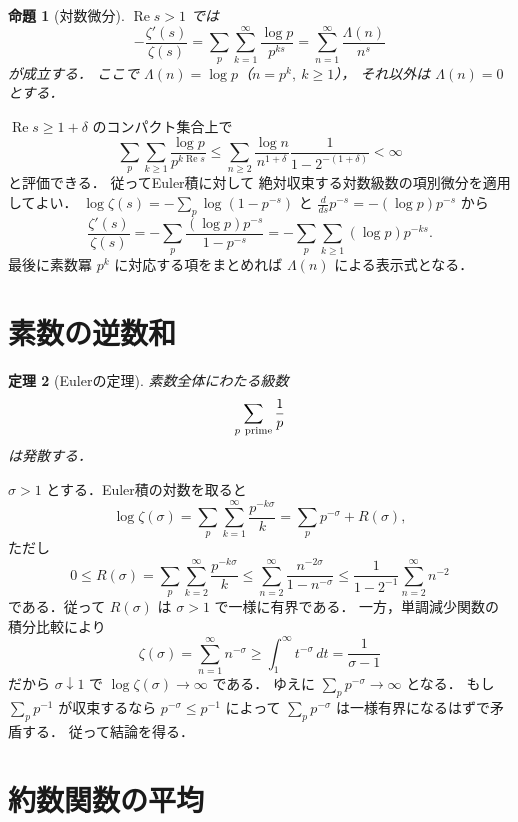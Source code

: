 \documentclass[a5paper,10pt,onecolumn]{jsarticle}
\makeatletter
\theoremstyle{mathnotetheorem}
\newtheorem{theorem}{定理}[section]
\newtheorem{proposition}[theorem]{命題}
\renewcommand{\proofname}{証明}
\renewenvironment{proof}[1][\proofname]{%
  \par\pushQED{\qed}\normalfont\topsep4\p@\@plus2\p@\relax
  \trivlist\item[\hskip\labelsep\bfseries #1]\ignorespaces
}{\popQED\endtrivlist\@endpefalse}
\makeatother
\begin{document}
\begin{proposition}[対数微分]\label{prop:log-derivative}
$\operatorname{Re}s>1$ では
\[
 -\frac{\zeta'(s)}{\zeta(s)}
 =\sum_p\sum_{k=1}^\infty
 \frac{\log p}{p^{ks}}
 =\sum_{n=1}^\infty\frac{\Lambda(n)}{n^s}
\]
が成立する．
ここで $\Lambda(n)=\log p$（$n=p^k,\ k\ge1$），
それ以外は $\Lambda(n)=0$ とする．
\end{proposition}
\begin{proof}
$\operatorname{Re}s\ge1+\delta$ のコンパクト集合上で
\[
 \sum_p\sum_{k\ge1}
 \frac{\log p}{p^{k\operatorname{Re}s}}
 \le\sum_{n\ge2}\frac{\log n}{n^{1+\delta}}
      \frac1{1-2^{-(1+\delta)}}
 <\infty
\]
と評価できる．
従ってEuler積に対して
絶対収束する対数級数の項別微分を適用してよい．
$\log\zeta(s)=-\sum_p\log(1-p^{-s})$ と
$\frac d{ds}p^{-s}=-(\log p)p^{-s}$
から
\[
 \frac{\zeta'(s)}{\zeta(s)}
 =-\sum_p\frac{(\log p)p^{-s}}{1-p^{-s}}
 =-\sum_p\sum_{k\ge1}(\log p)p^{-ks}.
\]
最後に素数冪 $p^k$ に対応する項をまとめれば
$\Lambda(n)$ による表示式となる．
\end{proof}

\section{素数の逆数和}

\begin{theorem}[Eulerの定理]\label{thm:prime-reciprocals}
素数全体にわたる級数
\[
 \sum_{p\ {\rm prime}}\frac1p
\]
は発散する．
\end{theorem}
\begin{proof}
$\sigma>1$ とする．Euler積の対数を取ると
\[
 \log\zeta(\sigma)
 =\sum_p\sum_{k=1}^\infty
 \frac{p^{-k\sigma}}k
 =\sum_pp^{-\sigma}+R(\sigma),
\]
ただし
\[
 0\le R(\sigma)
 =\sum_p\sum_{k=2}^\infty\frac{p^{-k\sigma}}k
 \le\sum_{n=2}^\infty
     \frac{n^{-2\sigma}}{1-n^{-\sigma}}
 \le\frac1{1-2^{-1}}
     \sum_{n=2}^\infty n^{-2}
\]
である．従って $R(\sigma)$ は
$\sigma>1$ で一様に有界である．
一方，単調減少関数の積分比較により
\[
 \zeta(\sigma)=\sum_{n=1}^\infty n^{-\sigma}
 \ge\int_1^\infty t^{-\sigma}\,dt
 =\frac1{\sigma-1}
\]
だから $\sigma\downarrow1$ で
$\log\zeta(\sigma)\to\infty$ である．
ゆえに $\sum_pp^{-\sigma}\to\infty$ となる．
もし $\sum_pp^{-1}$ が収束するなら
$p^{-\sigma}\le p^{-1}$ によって
$\sum_pp^{-\sigma}$ は一様有界になるはずで矛盾する．
従って結論を得る．
\end{proof}

\section{約数関数の平均}
\end{document}
